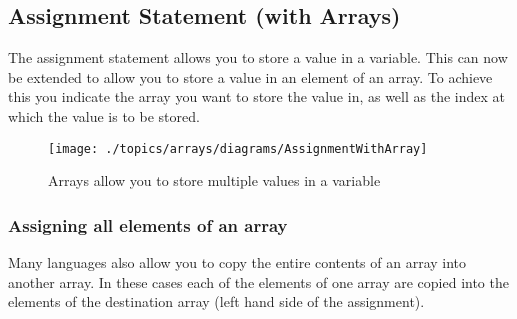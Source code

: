 \clearpage
\subsection{Assignment Statement (with Arrays)} %
\label{sub:assignment_statement_with_arrays_}

The assignment statement allows you to store a value in a variable. This can now be extended to allow you to store a value in an element of an array. To achieve this you indicate the array you want to store the value in, as well as the index at which the value is to be stored.

\begin{figure}[h]
   \centering
   \texttt{[image: ./topics/arrays/diagrams/AssignmentWithArray]} 
   \caption{Arrays allow you to store multiple values in a variable}
   \label{fig:assignment-with-arrays}
\end{figure}





\clearpage
\subsubsection{Assigning all elements of an array} %
\label{ssub:assigning_all_elements_of_an_array}

Many languages also allow you to copy the entire contents of an array into another array. In these cases each of the elements of one array are copied into the elements of the destination array (left hand side of the assignment).

